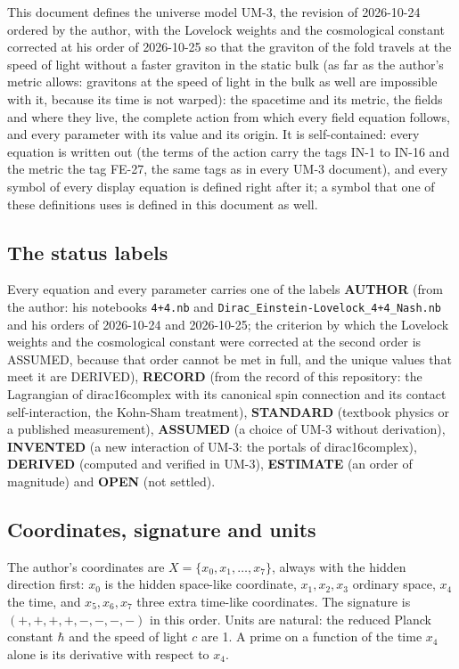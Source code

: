 \documentclass[
  10pt,
]{article}
\begin{document}
This document defines the universe model UM-3, the revision of
2026-10-24 ordered by the author, with the Lovelock weights and the
cosmological constant corrected at his order of 2026-10-25 so that the
graviton of the fold travels at the speed of light without a faster
graviton in the static bulk (as far as the author's metric allows:
gravitons at the speed of light in the bulk as well are impossible with
it, because its time is not warped): the spacetime and its metric, the
fields and where they live, the complete action from which every field
equation follows, and every parameter with its value and its origin. It
is self-contained: every equation is written out (the terms of the
action carry the tags IN-1 to IN-16 and the metric the tag FE-27, the
same tags as in every UM-3 document), and every symbol of every display
equation is defined right after it; a symbol that one of these
definitions uses is defined in this document as well.

\hypertarget{the-status-labels}{%
\subsection{The status labels}\label{the-status-labels}}

Every equation and every parameter carries one of the labels
\textbf{AUTHOR} (from the author: his notebooks \texttt{4+4.nb} and
\texttt{Dirac\_Einstein-Lovelock\_4+4\_Nash.nb} and his orders of
2026-10-24 and 2026-10-25; the criterion by which the Lovelock weights
and the cosmological constant were corrected at the second order is
ASSUMED, because that order cannot be met in full, and the unique values
that meet it are DERIVED), \textbf{RECORD} (from the record of this
repository: the Lagrangian of dirac16complex with its canonical spin
connection and its contact self-interaction, the Kohn-Sham treatment),
\textbf{STANDARD} (textbook physics or a published measurement),
\textbf{ASSUMED} (a choice of UM-3 without derivation),
\textbf{INVENTED} (a new interaction of UM-3: the portals of
dirac16complex), \textbf{DERIVED} (computed and verified in UM-3),
\textbf{ESTIMATE} (an order of magnitude) and \textbf{OPEN} (not
settled).

\hypertarget{coordinates-signature-and-units}{%
\subsection{Coordinates, signature and
units}\label{coordinates-signature-and-units}}

The author's coordinates are \(X = \{x_0, x_1, \dots, x_7\}\), always
with the hidden direction first: \(x_0\) is the hidden space-like
coordinate, \(x_1, x_2, x_3\) ordinary space, \(x_4\) the time, and
\(x_5, x_6, x_7\) three extra time-like coordinates. The signature is
\((+,+,+,+,-,-,-,-)\) in this order. Units are natural: the reduced
Planck constant \(\hbar\) and the speed of light \(c\) are 1. A prime on
a function of the time \(x_4\) alone is its derivative with respect to
\(x_4\).
\end{document}
